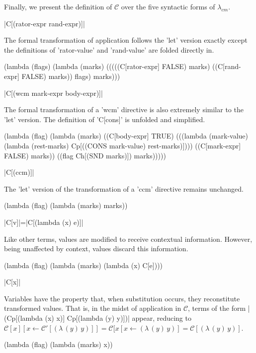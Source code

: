 \documentclass{llncs}
\newcommand{\cm}[0]{$\lambda_{cm}$}
\newcommand{\abs}[2]{(\lambda\,(#1)\,#2)}
\newcommand{\C}[1]{\mathcal{C}[#1]}
\newcommand{\Cp}[1]{\mathcal{C}'[#1]}
\begin{document}
Finally, we present the definition of $\mathcal{C}$ over the five syntactic forms of \cm.


\begin{schemedefn}{\scheme|C[(rator-expr rand-expr)]|}

The formal transformation of application follows the \scheme'let' version exactly except the definitions of \scheme'rator-value' and \scheme'rand-value' are folded directly in.
\begin{schemedisplay}
(lambda (flags)
  (lambda (marks)
    (((((C[rator-expr] FALSE) marks)
       ((C[rand-expr] FALSE) marks))
      flags)
     marks)))
\end{schemedisplay}
\end{schemedefn}

\begin{schemedefn}{\scheme|C[(wcm mark-expr body-expr)]|}

The formal transformation of a \scheme'wcm' directive is also extremely similar to the \scheme'let' version. The definition of \scheme'C[cons]' is unfolded and simplified.
\begin{schemedisplay}
(lambda (flag)
  (lambda (marks)
    ((C[body-expr] TRUE)
     (((lambda (mark-value) (lambda (rest-marks) Cp[((CONS mark-value) rest-marks)])))
       ((C[mark-expr] FALSE) marks))
      ((flag Ch[(SND marks)]) marks)))))
\end{schemedisplay}
\end{schemedefn}

\begin{schemedefn}{\scheme|C[(ccm)]|}

The \scheme'let' version of the transformation of a \scheme'ccm' directive remains unchanged.
\begin{schemedisplay}
(lambda (flag)
  (lambda (marks)
    marks))
\end{schemedisplay}
\end{schemedefn}

\begin{schemedefn}{\scheme|C[v]|=\scheme|C[(lambda (x) e)]|}

Like other terms, values are modified to receive contextual information. However, being unaffected by context, values discard this information.
\begin{schemedisplay}
(lambda (flag)
  (lambda (marks)
    (lambda (x) C[e])))
\end{schemedisplay}
\end{schemedefn}


\begin{schemedefn}{\scheme|C[x]|}

Variables have the property that, when substitution occurs, they reconstitute transformed values. That is, in the midst of application in $\mathcal{C}$, terms of the form \scheme|(Cp[(lambda (x) x)] Cp[(lambda (y) y)])| appear, reducing to $\C{x}[x\leftarrow \Cp{\abs{y}{y}}]=\C{x[x\leftarrow\abs{y}{y}}=\C{\abs{y}{y}}$.
\begin{schemedisplay}
(lambda (flag)
  (lambda (marks)
    x))
\end{schemedisplay}
\end{schemedefn}
\end{document}
